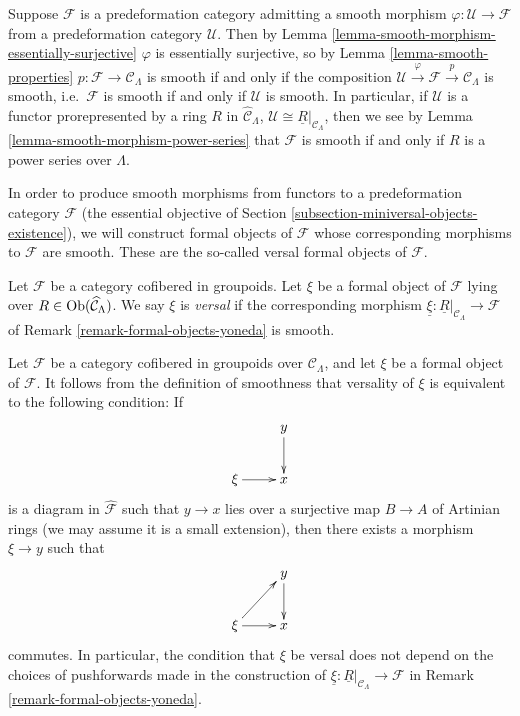 \begin{remark}
\label{remark-smooth-on-top}
Suppose $\mathcal F$ is a predeformation category admitting a smooth morphism 
$\varphi: \mathcal U \rightarrow \mathcal F$ from a predeformation category 
$\mathcal U$.  Then by
Lemma \ref{lemma-smooth-morphism-essentially-surjective} 
$\varphi$ is essentially surjective, so by
Lemma \ref{lemma-smooth-properties} 
$p: \mathcal F \rightarrow \mathcal C_{\Lambda}$ is smooth if and only if the 
composition $\mathcal U \xrightarrow{\varphi} \mathcal F \xrightarrow{p} 
\mathcal C_{\Lambda}$ is smooth, i.e.\ $\mathcal F$ is smooth if and only if 
$\mathcal U$ is smooth.  In particular, if $\mathcal U$ is a functor 
prorepresented by a ring $R$ in $\widehat{\mathcal C}_{\Lambda}$, $\mathcal U 
\cong \underline{R}|_{\mathcal C_{\Lambda}}$, then we see by
Lemma  \ref{lemma-smooth-morphism-power-series}
that $\mathcal F$ is smooth if and
only if $R$ is a power series over $\Lambda$.
\end{remark}

\noindent
In order to produce smooth morphisms from functors to a predeformation category 
$\mathcal F$ (the essential objective of Section 
\ref{subsection-miniversal-objects-existence}), we will construct formal 
objects of $\mathcal F$ whose corresponding morphisms to $\mathcal F$ are 
smooth.  These are the so-called versal formal objects of $\mathcal F$.

\begin{definition}
\label{definition-versal}
Let $\mathcal F$ be a category cofibered in groupoids.  Let $\xi$ be a formal 
object of $\mathcal F$ lying over $R \in \textnormal{Ob}(\widehat{\mathcal 
C}_{\Lambda})$.  We say $\xi$ is {\it versal} if the corresponding morphism 
$\underline{\xi}: \underline{R}|_{\mathcal C_{\Lambda}} \rightarrow \mathcal F$ 
of Remark \ref{remark-formal-objects-yoneda} is smooth.
\end{definition}

\begin{remark}
\label{remark-versal-object}
Let $\mathcal F$ be a category cofibered in groupoids over $\mathcal 
C_{\Lambda}$, and let $\xi$ be a formal object of $\mathcal F$.  It follows 
from the definition of smoothness that versality of $\xi$ is equivalent to the 
following condition: If 
\[
\xymatrix{
            &  y \ar[d] \\
\xi \ar[r]  &  x
}
\]
is a diagram in $\widehat{\mathcal F}$ such that $y \rightarrow x$ lies over a 
surjective map $B \rightarrow A$ of Artinian rings (we may assume it is a small 
extension),  then there exists a morphism $\xi \rightarrow y$ such that
\[
\xymatrix{
            &  y \ar[d] \\
\xi \ar[r] \ar[ur]  &  x
}
\] 
commutes. In particular, the condition that $\xi$ be versal does not depend on 
the choices of pushforwards made in the construction of $\underline{\xi}: 
\underline{R}|_{\mathcal C_{\Lambda}} \rightarrow \mathcal F$ in Remark 
\ref{remark-formal-objects-yoneda}.
\end{remark}


